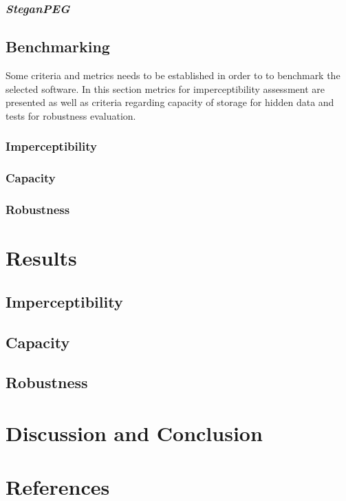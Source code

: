 \documentclass[11pt]{article}
\begin{document}
\subsubsection{\textit{}}

\subsubsection{\textit{SteganPEG}}

\subsection{Benchmarking}

Some criteria and metrics needs to be established in order to to benchmark the selected software.
In this section metrics for imperceptibility assessment are presented as well as criteria regarding capacity of storage for
hidden data and tests for robustness evaluation.

\subsubsection{Imperceptibility}

\subsubsection{Capacity}

\subsubsection{Robustness}


\section{Results}


\subsection{Imperceptibility}

\subsection{Capacity}

\subsection{Robustness}


\section{Discussion and Conclusion}


\section{References}
\end{document}
